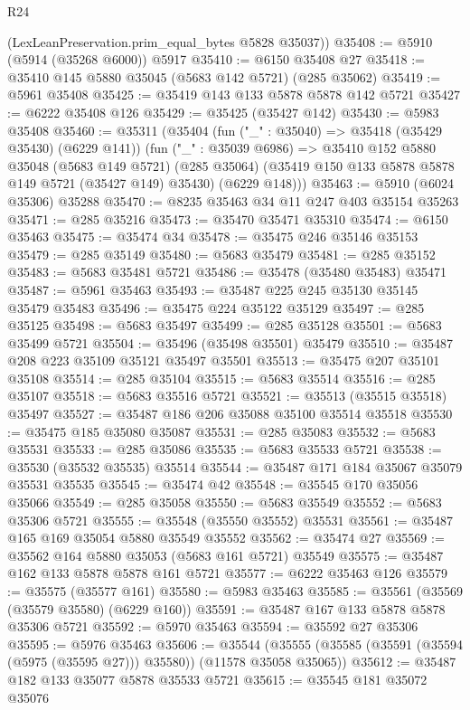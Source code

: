 \begin{lexlean}{R24}
\begin{coremodule}
      (LexLeanPreservation.prim_equal_bytes @5828 @35037))
@35408 := @5910 (@5914 (@35268 @6000)) @5917
@35410 := @6150 @35408 @27
@35418 := @35410 @145 @5880 @35045 (@5683 @142 @5721) (@285 @35062)
@35419 := @5961 @35408
@35425 := @35419 @143 @133 @5878 @5878 @142 @5721
@35427 := @6222 @35408 @126
@35429 := @35425 (@35427 @142)
@35430 := @5983 @35408
@35460 := @35311
    (@35404
      (fun ("_" : @35040) => @35418 (@35429 @35430) (@6229 @141))
      (fun ("_" : @35039 @6986) =>
      @35410
        @152
        @5880
        @35048
        (@5683 @149 @5721)
        (@285 @35064)
        (@35419 @150 @133 @5878 @5878 @149 @5721 (@35427 @149) @35430)
        (@6229 @148)))
@35463 := @5910 (@6024 @35306) @35288
@35470 := @8235 @35463 @34 @11 @247 @403 @35154 @35263
@35471 := @285 @35216
@35473 := @35470 @35471 @35310
@35474 := @6150 @35463
@35475 := @35474 @34
@35478 := @35475 @246 @35146 @35153
@35479 := @285 @35149
@35480 := @5683 @35479
@35481 := @285 @35152
@35483 := @5683 @35481 @5721
@35486 := @35478 (@35480 @35483) @35471
@35487 := @5961 @35463
@35493 := @35487 @225 @245 @35130 @35145 @35479 @35483
@35496 := @35475 @224 @35122 @35129
@35497 := @285 @35125
@35498 := @5683 @35497
@35499 := @285 @35128
@35501 := @5683 @35499 @5721
@35504 := @35496 (@35498 @35501) @35479
@35510 := @35487 @208 @223 @35109 @35121 @35497 @35501
@35513 := @35475 @207 @35101 @35108
@35514 := @285 @35104
@35515 := @5683 @35514
@35516 := @285 @35107
@35518 := @5683 @35516 @5721
@35521 := @35513 (@35515 @35518) @35497
@35527 := @35487 @186 @206 @35088 @35100 @35514 @35518
@35530 := @35475 @185 @35080 @35087
@35531 := @285 @35083
@35532 := @5683 @35531
@35533 := @285 @35086
@35535 := @5683 @35533 @5721
@35538 := @35530 (@35532 @35535) @35514
@35544 := @35487 @171 @184 @35067 @35079 @35531 @35535
@35545 := @35474 @42
@35548 := @35545 @170 @35056 @35066
@35549 := @285 @35058
@35550 := @5683 @35549
@35552 := @5683 @35306 @5721
@35555 := @35548 (@35550 @35552) @35531
@35561 := @35487 @165 @169 @35054 @5880 @35549 @35552
@35562 := @35474 @27
@35569 := @35562 @164 @5880 @35053 (@5683 @161 @5721) @35549
@35575 := @35487 @162 @133 @5878 @5878 @161 @5721
@35577 := @6222 @35463 @126
@35579 := @35575 (@35577 @161)
@35580 := @5983 @35463
@35585 := @35561 (@35569 (@35579 @35580) (@6229 @160))
@35591 := @35487 @167 @133 @5878 @5878 @35306 @5721
@35592 := @5970 @35463
@35594 := @35592 @27 @35306
@35595 := @5976 @35463
@35606 := @35544
    (@35555 (@35585 (@35591 (@35594 (@5975 (@35595 @27))) @35580)) (@11578 @35058 @35065))
@35612 := @35487 @182 @133 @35077 @5878 @35533 @5721
@35615 := @35545 @181 @35072 @35076

\end{coremodule}
\end{lexlean}
